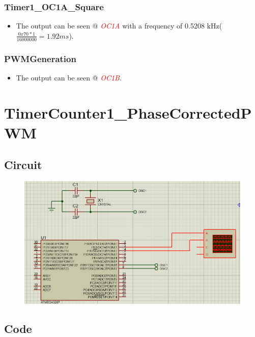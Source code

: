 \documentclass[oneside]{book}
\newcommand{\pinFormat}[1]{\emph{\textcolor{red}{#1}}}
\begin{document}
\subsubsection{Timer1\_OC1A\_Square}
\begin{itemize}
    \item The output can be seen @ \pinFormat{OC1A} with a frequency of 0.5208 kHz($\frac{0x70 * 1}{16000000} = 1.92 ms$).
\end{itemize}
\subsubsection{PWMGeneration}
\begin{itemize}
    \item The output can be seen @ \pinFormat{OC1B}.
\end{itemize}

\section{TimerCounter1\_PhaseCorrectedPWM}
\subsection{Circuit}
\begin{figure}[H]
    \centering
    \includegraphics[height=0.2\textheight]{TimerCounter1_PhaseCorrectedPWM.png}
\end{figure}
\subsection{Code}
\inputminted[breaklines, bgcolor=black]{c}{../programFiles/TimerCounter1_PhaseCorrectedPWM.c}
\end{document}
